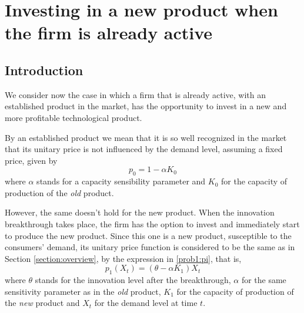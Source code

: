 
\chapter{Investing in a new product when the firm is already active}
\label{chapter:2}



\section{Introduction}
\label{section:2_intro}

We consider now the case in which a firm that is already active, with an established product in the market, has the opportunity to invest in a new and more profitable technological product.

By an established product we mean that it is so well recognized in the market that its unitary price is not influenced by the demand level, assuming a fixed price, given by
\begin{equation}
p_0=1-\alpha K_0
\label{p0}
\end{equation}
where $\alpha$ stands for a capacity sensibility parameter and $K_0$ for the capacity of production of the \textit{old} product. 

However, the same doesn't hold for the new product. When the innovation breakthrough takes place, the firm has the option to invest and immediately start to produce the new product. Since this one is a new product, susceptible to the consumers' demand, its unitary price function is considered to be the same as in Section \ref{section:overview}, by the expression in \eqref{prob1:pi}, that is,
\begin{equation}
p_1(X_t)=(\theta-\alpha K_1)X_t
\label{p1}
\end{equation}
where $\theta$ stands for the innovation level after the breakthrough, $\alpha$ for the same sensitivity parameter as in the \textit{old} product, $K_1$ for the capacity of production of the \textit{new} product and $X_t$ for the demand level at time $t$.

